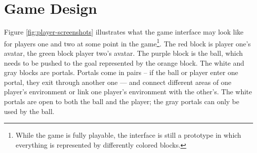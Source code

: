 \section{Game Design}


Figure \ref{fig:player-screenshots} illustrates what the game
interface may look like for players one and two at some point in the
game\footnote{While the game is fully playable, the interface is still
  a prototype in which everything is represented by differently
  colored blocks.}. The red block is player one's avatar, the green
block player two's avatar. The purple block is the ball, which needs
to be pushed to the goal represented by the orange block. The white
and gray blocks are portals. Portals come in pairs -- if the ball or
player enter one portal, they exit through another one --- and
connect different areas of one player's environment or link one
player's environment with the other's. The white portals are open to
both the ball and the player; the gray portals can only be used by the
ball.


